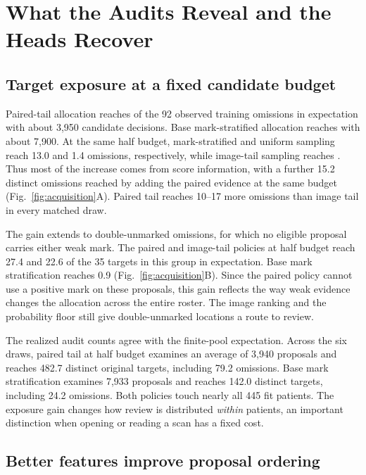 \section{What the Audits Reveal and the Heads Recover}
\label{sec:locked}

\subsection{Target exposure at a fixed candidate budget}

Paired-tail allocation reaches \ReachPair{} of the 92 observed training omissions in expectation with about 3,950 candidate decisions. Base mark-stratified allocation reaches \ReachMark{} with about 7,900. At the same half budget, mark-stratified and uniform sampling reach 13.0 and 1.4 omissions, respectively, while image-tail sampling reaches \ReachImage{}. Thus most of the increase comes from score information, with a further 15.2 distinct omissions reached by adding the paired evidence at the same budget (Fig.~\ref{fig:acquisition}A). Paired tail reaches 10--17 more omissions than image tail in every matched draw.

The gain extends to double-unmarked omissions, for which no eligible proposal carries either weak mark. The paired and image-tail policies at half budget reach 27.4 and 22.6 of the 35 targets in this group in expectation. Base mark stratification reaches 0.9 (Fig.~\ref{fig:acquisition}B). Since the paired policy cannot use a positive mark on these proposals, this gain reflects the way weak evidence changes the allocation across the entire roster. The image ranking and the probability floor still give double-unmarked locations a route to review.

The realized audit counts agree with the finite-pool expectation. Across the six draws, paired tail at half budget examines an average of 3,940 proposals and reaches 482.7 distinct original targets, including 79.2 omissions. Base mark stratification examines 7,933 proposals and reaches 142.0 distinct targets, including 24.2 omissions. Both policies touch nearly all 445 fit patients. The exposure gain changes how review is distributed \emph{within} patients, an important distinction when opening or reading a scan has a fixed cost.

\subsection{Better features improve proposal ordering}

